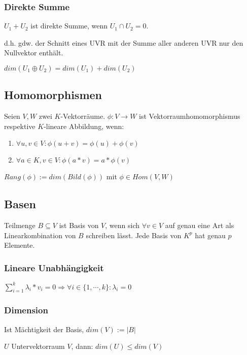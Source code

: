 \subsubsection*{Direkte Summe}

$U_1 + U_2$ ist direkte Summe, wenn $U_1 \cap U_2 = {0}$.

d.h. gdw. der Schnitt eines UVR mit der Summe aller anderen UVR nur den Nullvektor enthält.

$dim(U_1 \oplus U_2)=dim(U_1)+dim(U_2)$

\subsection*{Homomorphismen}

Seien $V, W$ zwei $K$-Vektorräume. $\phi : V \rightarrow W$ ist Vektorraumhomomorphismus respektive $K$-lineare Abbildung, wenn:

\begin{enumerate}[label=(\alph*)]
	\item $\forall u, v \in  V : \phi(u+v) = \phi(u)+\phi(v)$
	\item $\forall a \in K, v \in V : \phi(a*v) = a*\phi(v)$
\end{enumerate}

$Rang(\phi) := dim(Bild(\phi))$ mit $\phi \in Hom(V, W)$

\subsection*{Basen}

Teilmenge $B \subseteq V$ ist Basis von $V$, wenn sich $\forall v \in V$ auf genau eine Art als Linearkombination von $B$ schreiben lässt. Jede Basis von $K^p$ hat genau $p$ Elemente.

\subsubsection*{Lineare Unabhängigkeit}

$\sum_{i=1}^{k} \lambda_i * v_i = 0 \Rightarrow \forall i \in \{1, \cdots, k\} : \lambda_i = 0$

\subsubsection*{Dimension}

Ist Mächtigkeit der Basis, $dim(V) := |B|$

$U$ Untervektorraum $V$, dann: $dim(U) \leq dim(V)$

